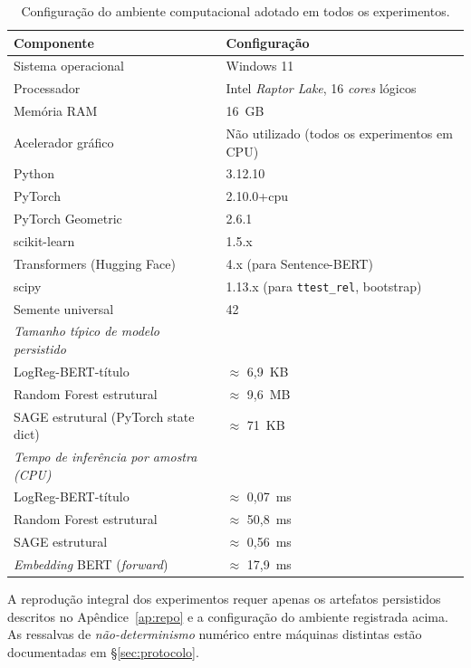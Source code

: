 \begin{table}[H]\centering
\caption{Configura\c{c}\~ao do ambiente computacional adotado em todos
os experimentos.}
\label{tab:hp_ambiente}
\small
\begin{tabular}{ll}
\toprule
\textbf{Componente} & \textbf{Configura\c{c}\~ao} \\
\midrule
Sistema operacional       & Windows 11 \\
Processador               & Intel \emph{Raptor Lake}, 16 \emph{cores} l\'ogicos \\
Mem\'oria RAM             & 16~GB \\
Acelerador gr\'afico      & N\~ao utilizado (todos os experimentos em CPU) \\
\midrule
Python                    & 3.12.10 \\
PyTorch                   & 2.10.0+cpu \\
PyTorch Geometric         & 2.6.1 \cite{fey2019pyg} \\
scikit-learn              & 1.5.x \\
Transformers (Hugging Face) & 4.x (para Sentence-BERT) \\
scipy                     & 1.13.x (para \texttt{ttest\_rel}, bootstrap) \\
\midrule
Semente universal         & 42 \\
\emph{Tamanho t\'ipico de modelo persistido} & \\
\quad LogReg-BERT-t\'itulo & $\approx$ 6,9~KB \\
\quad Random Forest estrutural & $\approx$ 9,6~MB \\
\quad SAGE estrutural (PyTorch state dict) & $\approx$ 71~KB \\
\emph{Tempo de infer\^encia por amostra (CPU)} & \\
\quad LogReg-BERT-t\'itulo & $\approx$ 0,07~ms \\
\quad Random Forest estrutural & $\approx$ 50,8~ms \\
\quad SAGE estrutural        & $\approx$ 0,56~ms \\
\quad \emph{Embedding} BERT (\emph{forward}) & $\approx$ 17,9~ms \\
\bottomrule
\end{tabular}
\end{table}

A reprodu\c{c}\~ao integral dos experimentos requer apenas os
artefatos persistidos descritos no Ap\^endice~\ref{ap:repo} e a
configura\c{c}\~ao do ambiente registrada acima. As ressalvas de
\emph{n\~ao-determinismo} num\'erico entre m\'aquinas distintas
est\~ao documentadas em \S\ref{sec:protocolo}.
